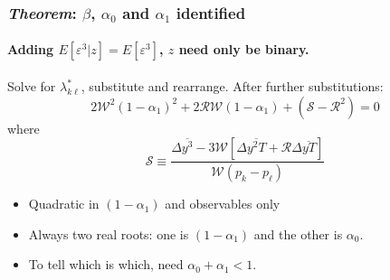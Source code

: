 \documentclass{beamer}
\begin{document}
%
%
%
\begin{frame}
  \frametitle{\emph{Theorem}: $\beta$, $\alpha_0$ and $\alpha_1$ identified}
  \framesubtitle{Adding $E[\varepsilon^3|z] = E[\varepsilon^3]$, $z$ need only be binary.}

    Solve for $\lambda^*_{k\ell}$, substitute and rearrange.
    After further substitutions:
  \begin{equation*}
    2\mathcal{W}^2 (1-\alpha_1)^2 + 2 \mathcal{R}\mathcal{W} (1-\alpha_1) + (\mathcal{S} -\mathcal{R}^2) = 0
  \end{equation*}
  where
  \begin{equation*}
    \mathcal{S} \equiv \frac{\Delta\overline{y^3} - 3 \mathcal{W}\left[ \Delta\overline{y^2T}+\mathcal{R}\Delta\overline{yT} \right]}{\mathcal{W}(p_k - p_\ell)}
  \end{equation*}

  \begin{itemize}
    \item Quadratic in $(1-\alpha_1)$ and observables only
    \item Always two real roots: one is $(1-\alpha_1)$ and the other is $\alpha_0$.
    \item To tell which is which, need $\alpha_0 + \alpha_1 < 1$.
  \end{itemize}


\end{frame}
\end{document}
